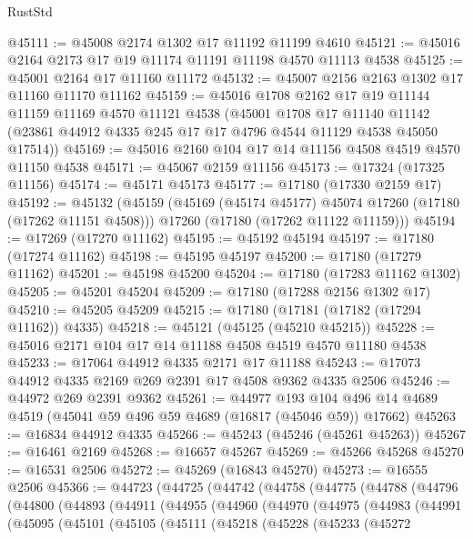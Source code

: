 \begin{lexlean}{RustStd}
\begin{coremodule}
{\begin{coremodule}
{{{{{{{{{{{{{{{{{{{{{{{{{{{{{{{{{{{{{{{{{{{{{{{{{{{{{{{@45111 := @45008 @2174 @1302 @17 @11192 @11199 @4610
@45121 := @45016 @2164 @2173 @17 @19 @11174 @11191 @11198 @4570 @11113 @4538
@45125 := @45001 @2164 @17 @11160 @11172
@45132 := @45007 @2156 @2163 @1302 @17 @11160 @11170 @11162
@45159 := @45016
    @1708
    @2162
    @17
    @19
    @11144
    @11159
    @11169
    @4570
    @11121
    @4538
    (@45001
      @1708
      @17
      @11140
      @11142
      (@23861 @44912 @4335 @245 @17 @17 @4796 @4544 @11129 @4538 @45050 @17514))
@45169 := @45016 @2160 @104 @17 @14 @11156 @4508 @4519 @4570 @11150 @4538
@45171 := @45067 @2159 @11156
@45173 := @17324 (@17325 @11156)
@45174 := @45171 @45173
@45177 := @17180 (@17330 @2159 @17)
@45192 := @45132
    (@45159
      (@45169 (@45174 @45177) @45074 @17260 (@17180 (@17262 @11151 @4508)))
      @17260
      (@17180 (@17262 @11122 @11159)))
@45194 := @17269 (@17270 @11162)
@45195 := @45192 @45194
@45197 := @17180 (@17274 @11162)
@45198 := @45195 @45197
@45200 := @17180 (@17279 @11162)
@45201 := @45198 @45200
@45204 := @17180 (@17283 @11162 @1302)
@45205 := @45201 @45204
@45209 := @17180 (@17288 @2156 @1302 @17)
@45210 := @45205 @45209
@45215 := @17180 (@17181 (@17182 (@17294 @11162)) @4335)
@45218 := @45121 (@45125 (@45210 @45215))
@45228 := @45016 @2171 @104 @17 @14 @11188 @4508 @4519 @4570 @11180 @4538
@45233 := @17064 @44912 @4335 @2171 @17 @11188
@45243 := @17073 @44912 @4335 @2169 @269 @2391 @17 @4508 @9362 @4335 @2506
@45246 := @44972 @269 @2391 @9362
@45261 := @44977
    @193
    @104
    @496
    @14
    @4689
    @4519
    (@45041 @59 @496 @59 @4689 (@16817 (@45046 @59)) @17662)
@45263 := @16834 @44912 @4335
@45266 := @45243 (@45246 (@45261 @45263))
@45267 := @16461 @2169
@45268 := @16657 @45267
@45269 := @45266 @45268
@45270 := @16531 @2506
@45272 := @45269 (@16843 @45270)
@45273 := @16555 @2506
@45366 := @44723
    (@44725
      (@44742
        (@44758
          (@44775
            (@44788
              (@44796
                (@44800
                  (@44893
                    (@44911
                      (@44955
                        (@44960
                          (@44970
                            (@44975
                              (@44983
                                (@44991
                                  (@45095
                                    (@45101
                                      (@45105
                                        (@45111
                                          (@45218
                                            (@45228
                                              (@45233
                                                (@45272
}}}}}}}}}}}}}}}}}}}}}}}}}}}}}}}}}}}}}}}}}}}}}}}}}}}}}}}
\end{coremodule}}
\end{coremodule}
\end{lexlean}
